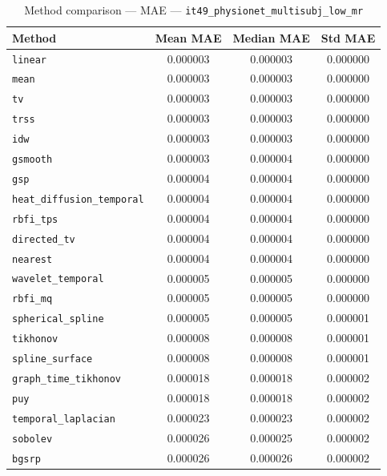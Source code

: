 \begin{table}[ht]
\centering
\caption{Method comparison — MAE — \texttt{it49_physionet_multisubj_low_mr}}
\label{tab:mae_it49_physionet_multisubj_low_mr}
\begin{tabular}{lccc}
\hline
Method & Mean MAE & Median MAE & Std MAE \\
\hline
\texttt{linear} & 0.000003 & 0.000003 & 0.000000 \\
\texttt{mean} & 0.000003 & 0.000003 & 0.000000 \\
\texttt{tv} & 0.000003 & 0.000003 & 0.000000 \\
\texttt{trss} & 0.000003 & 0.000003 & 0.000000 \\
\texttt{idw} & 0.000003 & 0.000003 & 0.000000 \\
\texttt{gsmooth} & 0.000003 & 0.000004 & 0.000000 \\
\texttt{gsp} & 0.000004 & 0.000004 & 0.000000 \\
\texttt{heat_diffusion_temporal} & 0.000004 & 0.000004 & 0.000000 \\
\texttt{rbfi_tps} & 0.000004 & 0.000004 & 0.000000 \\
\texttt{directed_tv} & 0.000004 & 0.000004 & 0.000000 \\
\texttt{nearest} & 0.000004 & 0.000004 & 0.000000 \\
\texttt{wavelet_temporal} & 0.000005 & 0.000005 & 0.000000 \\
\texttt{rbfi_mq} & 0.000005 & 0.000005 & 0.000000 \\
\texttt{spherical_spline} & 0.000005 & 0.000005 & 0.000001 \\
\texttt{tikhonov} & 0.000008 & 0.000008 & 0.000001 \\
\texttt{spline_surface} & 0.000008 & 0.000008 & 0.000001 \\
\texttt{graph_time_tikhonov} & 0.000018 & 0.000018 & 0.000002 \\
\texttt{puy} & 0.000018 & 0.000018 & 0.000002 \\
\texttt{temporal_laplacian} & 0.000023 & 0.000023 & 0.000002 \\
\texttt{sobolev} & 0.000026 & 0.000025 & 0.000002 \\
\texttt{bgsrp} & 0.000026 & 0.000026 & 0.000002 \\
\hline
\end{tabular}
\end{table}
